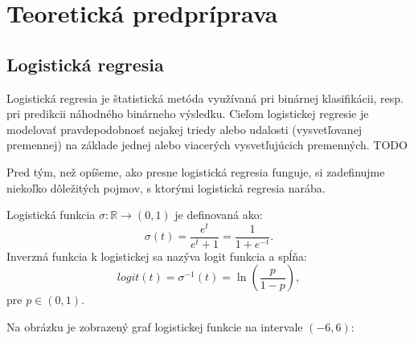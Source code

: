 \section{Teoretická predpríprava}
\label{teoreticka predpriprava}

\subsection{Logistická regresia}
 
Logistická regresia je štatistická metóda využívaná pri binárnej klasifikácii, resp. pri predikcii náhodného binárneho výsledku.
Cieľom logistickej regresie je modelovať pravdepodobnosť nejakej triedy alebo udalosti (vysvetľovanej premennej)
na základe jednej alebo viacerých vysvetľujúcich premenných. TODO

Pred tým, než opíšeme, ako presne logistická regresia funguje, si zadefinujme niekoľko dôležitých pojmov, s ktorými logistická regresia narába.

\begin{defin}
    Logistická funkcia \( \sigma : \mathbb{R} \rightarrow (0, 1) \) je definovaná ako:
    \[
        \sigma(t) = \frac{e^t}{e^t + 1} = \frac{1}{1 + e^{-t}}.
    \]
    Inverzná funkcia k logistickej sa nazýva logit funkcia a spĺňa:
    \[
        logit(t) = \sigma^{-1}(t) = \ln\left(\frac{p}{1 - p}\right),
    \]
    pre \( p \in (0, 1) \).
\end{defin}

Na obrázku je zobrazený graf logistickej funkcie na intervale \( (-6, 6) \):

    
        


